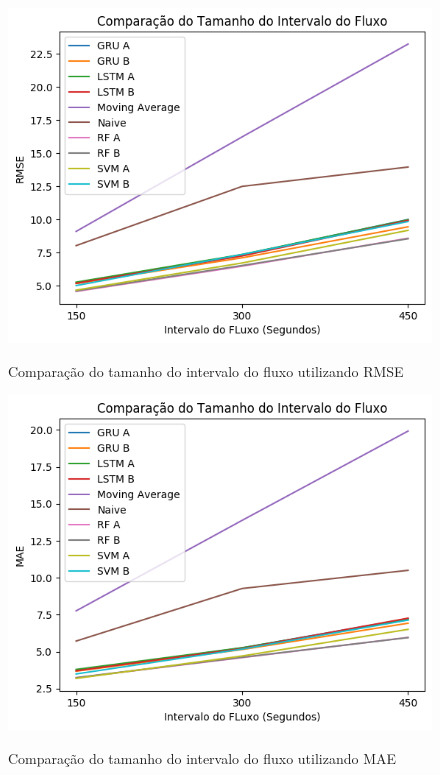 
\begin{figure}[htbp]
    \centering
    \includegraphics[scale=0.8]{monography/img/comparisons/comparacao_do_tamanho_do_intervalo_do_fluxo_rmse.png}
    \label{figure:tamanho_do_intervalo_do_fluxo_rmse}
    \caption{Comparação do tamanho do intervalo do fluxo utilizando RMSE}
\end{figure}

\begin{figure}[htbp]
    \centering
    \includegraphics[scale=0.8]{monography/img/comparisons/comparacao_do_tamanho_do_intervalo_do_fluxo_mae.png}
    \label{figure:tamanho_do_intervalo_do_fluxo_mae}
    \caption{Comparação do tamanho do intervalo do fluxo utilizando MAE}
\end{figure}

